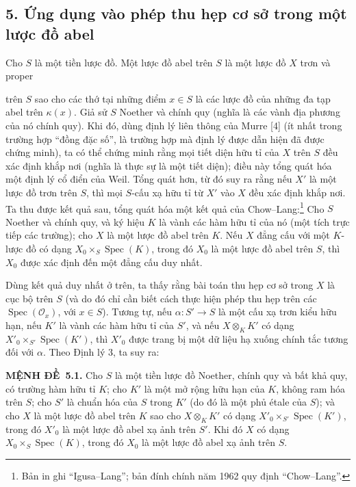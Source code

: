 \documentclass[11pt,twoside,openany]{book}
\numberwithin{equation}{section}
\newcommand{\src}[1]{%
  \phantomsection\hypertarget{src:\fgasourceid:#1}{}%
  \marginpar{\raggedleft\footnotesize\sffamily #1}%
}
\newcommand{\fgasourceid}{unset}
\newcommand{\result}[2]{\par\medskip\noindent\textbf{#1\if\relax\detokenize{#2}\relax\else\ #2\fi.}\quad}
\begin{document}
\subsection*{5. Ứng dụng vào phép thu hẹp cơ sở trong một lược đồ abel}

Cho $S$ là một tiền lược đồ. Một lược đồ abel trên $S$ là một lược đồ $X$ trơn
và proper

\src{324}
trên $S$ sao cho các thớ tại những điểm $x\in S$ là các lược đồ của những đa
tạp abel trên $\kappa(x)$. Giả sử $S$ Noether và chính quy (nghĩa là các vành
địa phương của nó chính quy). Khi đó, dùng định lý liên thông của Murre [4]
(ít nhất trong trường hợp ``đồng đặc số'', là trường hợp mà định lý được dẫn
hiện đã được chứng minh), ta có thể chứng minh rằng mọi tiết diện hữu tỉ của
$X$ trên $S$ đều xác định khắp nơi (nghĩa là thực sự là một tiết diện); điều
này tổng quát hóa một định lý cổ điển của Weil. Tổng quát hơn, từ đó suy ra
rằng nếu $X'$ là một lược đồ trơn trên $S$, thì mọi $S$-cấu xạ hữu tỉ từ $X'$
vào $X$ đều xác định khắp nơi. Ta thu được kết quả sau, tổng quát hóa một kết
quả của Chow--Lang:\footnote{Bản in ghi ``Igusa--Lang''; bản đính chính năm
1962 quy định ``Chow--Lang''.} Cho $S$ Noether và chính quy, và ký hiệu $K$ là
vành các hàm hữu tỉ của nó (một tích trực tiếp các trường); cho $X$ là một lược
đồ abel trên $K$. Nếu $X$ đẳng cấu với một $K$-lược đồ có dạng
$X_0\times_S\operatorname{Spec}(K)$, trong đó $X_0$ là một lược đồ abel trên
$S$, thì $X_0$ được xác định đến một đẳng cấu duy nhất.

Dùng kết quả duy nhất ở trên, ta thấy rằng bài toán thu hẹp cơ sở trong $X$ là
cục bộ trên $S$ (và do đó chỉ cần biết cách thực hiện phép thu hẹp trên các
$\operatorname{Spec}(\mathcal O_x)$, với $x\in S$). Tương tự, nếu
$\alpha:S'\longrightarrow S$ là một cấu xạ trơn kiểu hữu hạn, nếu $K'$ là
vành các hàm hữu tỉ của $S'$, và nếu $X\otimes_KK'$ có dạng
$X'_0\times_{S'}\operatorname{Spec}(K')$, thì $X'_0$ được trang bị một dữ liệu
hạ xuống chính tắc tương đối với $\alpha$. Theo Định lý 3, ta suy ra:

\result{MỆNH ĐỀ}{5.1} Cho $S$ là một tiền lược đồ Noether, chính quy và bất khả
quy, có trường hàm hữu tỉ $K$; cho $K'$ là một mở rộng hữu hạn của $K$, không
ram hóa trên $S$; cho $S'$ là chuẩn hóa của $S$ trong $K'$ (do đó là một phủ
étale của $S$); và cho $X$ là một lược đồ abel trên $K$ sao cho
$X\otimes_KK'$ có dạng $X'_0\times_{S'}\operatorname{Spec}(K')$, trong đó
$X'_0$ là một lược đồ abel xạ ảnh trên $S'$. Khi đó $X$ có dạng
$X_0\times_S\operatorname{Spec}(K)$, trong đó $X_0$ là một lược đồ abel xạ ảnh
trên $S$.
\end{document}
